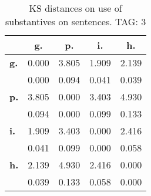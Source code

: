 \begin{table}[h!]
\begin{center}
\begin{tabular}{| l || c | c | c | c |}\hline
 & {\bf g.} & {\bf p.} & {\bf i.} & {\bf h.} \\\hline\hline
{\bf g.} & 0.000 & 3.805 & 1.909 & 2.139 \\
{\bf } & 0.000 & 0.094 & 0.041 & 0.039 \\\hline
{\bf p.} & 3.805 & 0.000 & 3.403 & 4.930 \\
{\bf } & 0.094 & 0.000 & 0.099 & 0.133 \\\hline
{\bf i.} & 1.909 & 3.403 & 0.000 & 2.416 \\
{\bf } & 0.041 & 0.099 & 0.000 & 0.058 \\\hline
{\bf h.} & 2.139 & 4.930 & 2.416 & 0.000 \\
{\bf } & 0.039 & 0.133 & 0.058 & 0.000 \\\hline
\end{tabular}
\caption{KS distances on use of substantives on sentences. TAG: 3}
\end{center}
\end{table}